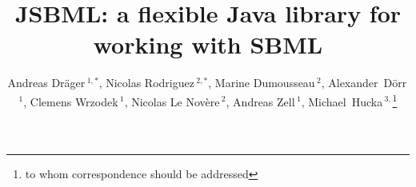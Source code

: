 \documentclass{bioinfo}
\begin{document}
\application
\title[JSBML: The Java library for SBML]{JSBML: a flexible Java library
for working with SBML} \author[Dr\"ager and Rodriguez \textit{et~al.}]{Andreas
Dr\"ager\,$^{1,*}$,
Nicolas Rodriguez\,$^{2,*}$,
Marine Dumousseau\,$^{2}$,
Alexander~D\"orr\,$^{1}$,
Clemens Wrzodek\,$^{1}$,
Nicolas Le Nov\`{e}re\,$^{2}$,
Andreas Zell\,$^{1}$,
Michael~Hucka\,$^{3,}$\footnote{to whom correspondence should be addressed}}
\address{$^{1}$Center for Bioinformatics Tuebingen (ZBIT), University of
Tuebingen, T\"ubingen, Germany\\
$^{2}$European Bioinformatics Institute, Wellcome Trust Genome Campus,
Hinxton, Cambridge, UK\\
$^{3}$Computing and Mathematical Sciences, California Institute of Technology,
Pasadena, CA, USA}



\maketitle
\end{document}
